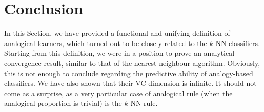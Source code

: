 %
%
%

\section*{Conclusion}

In this Section, we have provided a functional and unifying definition of
analogical learners, which turned out to be closely related to the $k$-NN
classifiers. Starting from this definition, we were in a position to
prove an analytical convergence result, similar to that of the nearest neighbour
algorithm. Obviously, this is not enough to conclude regarding the predictive
ability of analogy-based classifiers. We have also shown that their
VC-dimension is infinite. It should not come as a surprise, as a very
particular case of analogical rule (when the analogical proportion is trivial)
is the $k$-NN rule.

